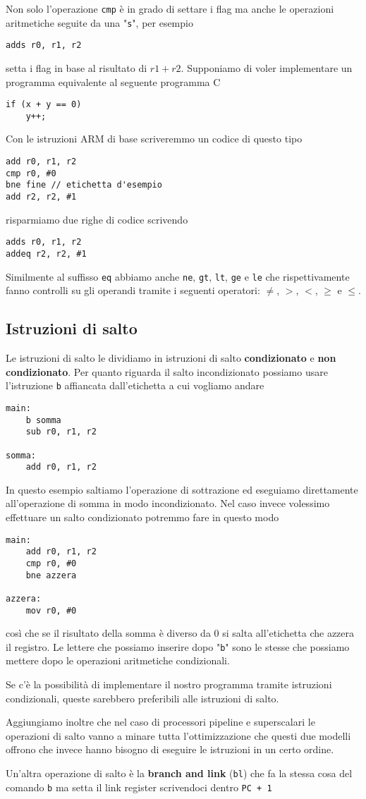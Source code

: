 Non solo l'operazione \verb|cmp| è in grado di settare i flag ma anche le operazioni aritmetiche
seguite da una "\verb|s|", per esempio
\begin{verbatim}
adds r0, r1, r2
\end{verbatim}
setta i flag in base al risultato di $r1 + r2$. Supponiamo di voler implementare un programma
equivalente al seguente programma C
\begin{verbatim}
if (x + y == 0)
	y++;
\end{verbatim}
Con le istruzioni ARM di base scriveremmo un codice di questo tipo
\begin{verbatim}
add r0, r1, r2
cmp r0, #0
bne fine // etichetta d'esempio
add r2, r2, #1
\end{verbatim}
risparmiamo due righe di codice scrivendo
\begin{verbatim}
adds r0, r1, r2
addeq r2, r2, #1
\end{verbatim}
Similmente al suffisso \verb|eq| abbiamo anche \verb|ne|, \verb|gt|, \verb|lt|, \verb|ge| e
\verb|le| che rispettivamente fanno controlli su gli operandi tramite i seguenti operatori:
$\neq$, $>$, $<$, $\geq$ e $\leq$.

\subsection{Istruzioni di salto}
Le istruzioni di salto le dividiamo in istruzioni di salto \textbf{condizionato} e
\textbf{non condizionato}. Per quanto riguarda il salto incondizionato possiamo usare l'istruzione
\verb|b| affiancata dall'etichetta a cui vogliamo andare
\begin{verbatim}
main:
	b somma
	sub r0, r1, r2

somma:
	add r0, r1, r2
\end{verbatim}
In questo esempio saltiamo l'operazione di sottrazione ed eseguiamo direttamente all'operazione di
somma in modo incondizionato. Nel caso invece volessimo effettuare un salto condizionato potremmo
fare in questo modo
\begin{verbatim}
main:
	add r0, r1, r2
	cmp r0, #0
	bne azzera

azzera:
	mov r0, #0
\end{verbatim}
così che se il risultato della somma è diverso da 0 si salta all'etichetta che azzera il registro.
Le lettere che possiamo inserire dopo "\verb|b|" sono le stesse che possiamo mettere dopo le
operazioni aritmetiche condizionali.

Se c'è la possibilità di implementare il nostro programma tramite istruzioni condizionali, queste
sarebbero preferibili alle istruzioni di salto.

Aggiungiamo inoltre che nel caso di processori pipeline e superscalari le operazioni di salto vanno
a minare tutta l'ottimizzazione che questi due modelli offrono che invece hanno bisogno di eseguire
le istruzioni in un certo ordine.

Un'altra operazione di salto è la \textbf{branch and link} (\verb|bl|) che fa la stessa cosa del
comando \verb|b| ma setta il link register scrivendoci dentro \verb|PC + 1|